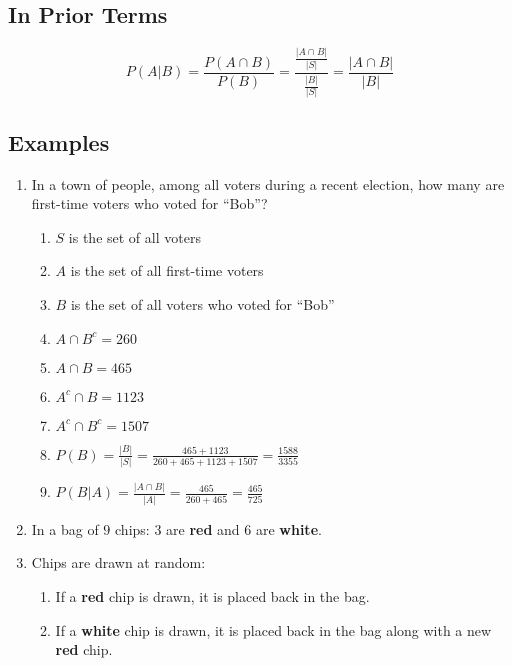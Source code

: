 \documentclass[12pt]{article}
\begin{document}
        \subsection{In Prior Terms}
            \begin{equation}
                P(A|B) = \frac{P(A \cap B)}{P(B)} = \frac{\frac{|A \cap B|}{|S|}}{\frac{|B|}{|S|}} = \frac{|A \cap B|}{|B|}
            \end{equation}
        \subsection{Examples}
            \begin{enumerate}
                \item In a town of people, among all voters during a recent election, how many are first-time voters who voted for ``Bob''?
                \begin{enumerate}
                    \item $S$ is the set of all voters
                    \item $A$ is the set of all first-time voters
                    \item $B$ is the set of all voters who voted for ``Bob''
                    \item $A \cap B^c = 260$
                    \item $A \cap B = 465$ 
                    \item $A^c \cap B = 1123$
                    \item $A^c \cap B^c = 1507$
                    \item $P(B) = \frac{|B|}{|S|} = \frac{465 + 1123}{260 + 465 + 1123 + 1507} = \frac{1588}{3355}$
                    \item $P(B|A) = \frac{|A \cap B|}{|A|} = \frac{465}{260 + 465} = \frac{465}{725}$
                \end{enumerate}
                \item In a bag of $9$ chips: $3$ are \textbf{red} and $6$ are \textbf{white}.
                \item Chips are drawn at random:
                \begin{enumerate}
                    \item If a \textbf{red} chip is drawn, it is placed back in the bag.
                    \item If a \textbf{white} chip is drawn, it is placed back in the bag along with a new \textbf{red} chip.
                \end{enumerate}

\end{enumerate}
\end{document}
